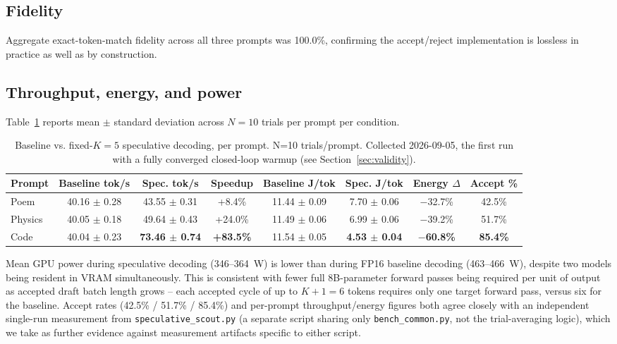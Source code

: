 \documentclass[conference]{IEEEtran}
\begin{document}
\subsection{Fidelity}

Aggregate exact-token-match fidelity across all three prompts was
100.0\%, confirming the accept/reject implementation is lossless
in practice as well as by construction.

\subsection{Throughput, energy, and power}

Table~\ref{tab:results} reports mean $\pm$ standard deviation across
$N{=}10$ trials per prompt per condition.

\begin{table}[t]
\centering
\caption{Baseline vs. fixed-$K{=}5$ speculative decoding, per prompt. N=10 trials/prompt. Collected 2026-09-05, the first run with a fully converged closed-loop warmup (see Section~\ref{sec:validity}).}
\label{tab:results}
\begin{tabular}{lccccccc}
\toprule
Prompt & Baseline tok/s & Spec. tok/s & Speedup & Baseline J/tok & Spec. J/tok & Energy $\Delta$ & Accept \% \\
\midrule
Poem     & 40.16 $\pm$ 0.28 & 43.55 $\pm$ 0.31 & +8.4\% & 11.44 $\pm$ 0.09 & 7.70 $\pm$ 0.06 & $-$32.7\% & 42.5\% \\
Physics  & 40.05 $\pm$ 0.18 & 49.64 $\pm$ 0.43 & +24.0\% & 11.49 $\pm$ 0.06 & 6.99 $\pm$ 0.06 & $-$39.2\% & 51.7\% \\
Code     & 40.04 $\pm$ 0.23 & \textbf{73.46 $\pm$ 0.74} & \textbf{+83.5\%} & 11.54 $\pm$ 0.05 & \textbf{4.53 $\pm$ 0.04} & \textbf{$-$60.8\%} & \textbf{85.4\%} \\
\bottomrule
\end{tabular}
\end{table}

Mean GPU power during speculative decoding (346--364~W) is
lower than during FP16 baseline decoding
(463--466~W), despite two models being resident in VRAM
simultaneously. This is consistent with fewer full 8B-parameter forward
passes being required per unit of output as accepted draft batch length
grows -- each accepted cycle of up to $K{+}1{=}6$ tokens requires only one
target forward pass, versus six for the baseline. Accept rates (42.5\% /
51.7\% / 85.4\%) and per-prompt throughput/energy figures both agree
closely with an independent single-run measurement from
\texttt{speculative\_scout.py} (a separate script sharing only
\texttt{bench\_common.py}, not the trial-averaging logic), which we take as
further evidence against measurement artifacts specific to either script.
\end{document}

